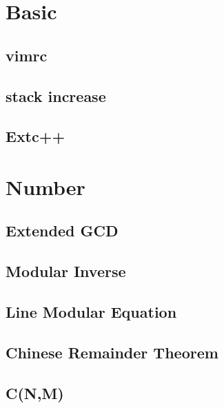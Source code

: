 \documentclass[10pt,twocolumn,oneside]{article}
\begin{document}
    \pagestyle{fancy}
    \fancyfoot{}
    \fancyhead[R]{\thepage}
    \renewcommand{\headrulewidth}{0.4pt}
    \renewcommand{\contentsname}{Codebook} 

    \scriptsize
    \tableofcontents

    \newpage

    \section{Basic}
    \subsection{vimrc}
    
    \subsection{stack increase}
    
    \subsection{Extc++}
    
    \newpage


    \section{Number}
    \subsection{Extended GCD}
    
    \subsection{Modular Inverse}
    
    \subsection{Line Modular Equation}
    
    \subsection{Chinese Remainder Theorem}
    
    \subsection{C(N,M)}
    
\end{document}
